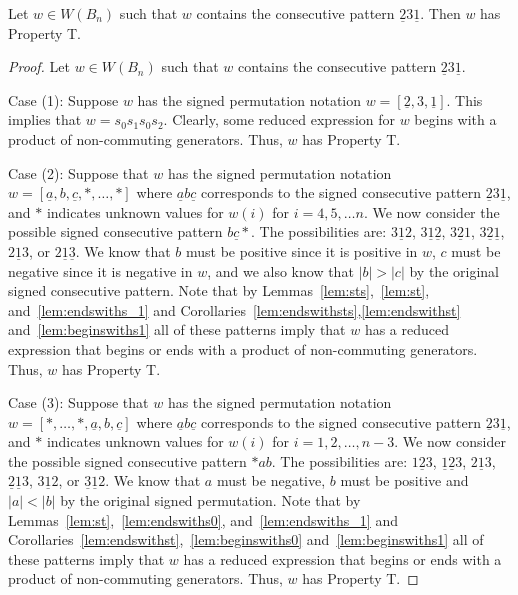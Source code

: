 \begin{lemma}\label{lem:2312}
Let $w \in W(B_n)$ such that $w$ contains the consecutive pattern $\underline{2}3\underline{1}$. Then $w$ has Property T.
\begin{proof}
	Let $w \in W(B_n)$ such that $w$ contains the consecutive pattern $\underline{2}3\underline{1}$.
	
	Case (1): Suppose $w$ has the signed permutation notation $w=[\underline{2},3,\underline{1}]$. This implies that $w=s_0s_1s_0s_2$. Clearly, some reduced expression for $w$ begins with a product of non-commuting generators. Thus, $w$ has Property T.
	
	Case (2): Suppose that $w$ has the signed permutation notation $w=[\underline{a},b,\underline{c}, \ast, \ldots, \ast]$ where $\underline{a}b\underline{c}$ corresponds to the signed consecutive pattern $\underline{2}3\underline{1}$, and $\ast$ indicates unknown values for $w(i)$ for $i=4,5, \ldots n$. We now consider the possible signed consecutive pattern $b \underline{c} \ast$. The possibilities are: $3\underline{1}2$, $3\underline{1}\underline{2}$, $3\underline{2}1$, $3 \underline{2}\underline{1}$, $2\underline{1}3$, or $2\underline{1}\underline{3}$. We know that $b$ must be positive since it is positive in $w$, $c$ must be negative since it is negative in $w$, and we also know that $|b|>|c|$ by the original signed consecutive pattern. Note that by Lemmas~\ref{lem:sts},~\ref{lem:st}, and~\ref{lem:endswiths_1} and Corollaries~\ref{lem:endswithsts},\ref{lem:endswithst} and~\ref{lem:beginswiths1} all of these patterns imply that $w$ has a reduced expression that begins or ends with a product of non-commuting generators. Thus, $w$ has Property T.
	
	Case (3): Suppose that $w$ has the signed permutation notation $w=[\ast, \ldots, \ast, \underline{a},b,\underline{c}]$ where $\underline{a}b\underline{c}$ corresponds to the signed consecutive pattern $\underline{2}3\underline{1}$, and $\ast$ indicates unknown values for $w(i)$ for $i=1,2, \ldots ,n-3$. We now consider the possible signed consecutive pattern $\ast ab$. The possibilities are: $1 \underline{2} 3$, $\underline{1} \underline{2} 3$, $2 \underline{1} 3$, $\underline{2} \underline{1} 3$, $3 \underline{1} 2$, or $\underline{3} \underline{1} 2$. We know that $a$ must be negative, $b$ must be positive and $|a|<|b|$ by the original signed permutation. Note that by Lemmas~\ref{lem:st},~\ref{lem:endswiths0}, and~\ref{lem:endswiths_1} and Corollaries~\ref{lem:endswithst},~\ref{lem:beginswiths0} and~\ref{lem:beginswiths1} all of these patterns imply that $w$ has a reduced expression that begins or ends with a product of non-commuting generators. Thus, $w$ has Property T. 


\end{proof}
\end{lemma}
